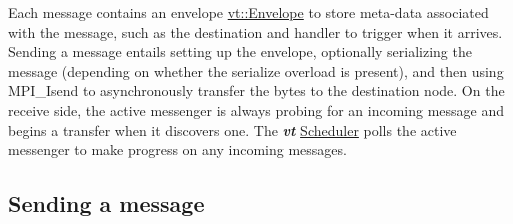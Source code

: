 Each message contains an envelope {\ttfamily \hyperlink{namespacevt_aa9c8cc094b5361482021d63012987814}{vt\+::\+Envelope}} to store meta-\/data associated with the message, such as the destination and handler to trigger when it arrives. Sending a message entails setting up the envelope, optionally serializing the message (depending on whether the serialize overload is present), and then using {\ttfamily M\+P\+I\+\_\+\+Isend} to asynchronously transfer the bytes to the destination node. On the receive side, the active messenger is always probing for an incoming message and begins a transfer when it discovers one. The {\bfseries {\itshape vt}} \hyperlink{scheduler}{Scheduler} polls the active messenger to make progress on any incoming messages.\hypertarget{active-messenger_am-simple-example}{}\subsection{Sending a message}\label{active-messenger_am-simple-example}

